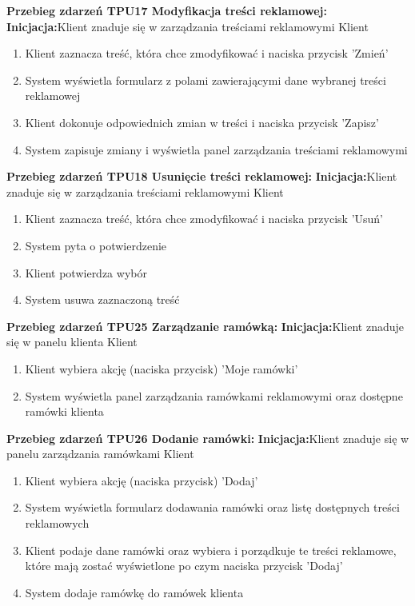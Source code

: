 \documentclass[10pt,a4paper,titlepage]{article} %
\begin{document}
		{\bf Przebieg zdarzeń TPU17 Modyfikacja treści reklamowej:}\newline
		{\bf Inicjacja:}Klient znaduje się w zarządzania treściami reklamowymi
		 Klient
			\begin{enumerate}
			  \item Klient zaznacza treść, która chce zmodyfikować i naciska przycisk
			  'Zmień'
			  \item System wyświetla formularz z polami zawierającymi dane wybranej
			  treści reklamowej
			  \item Klient dokonuje odpowiednich zmian w treści i naciska przycisk
			  'Zapisz'
			  \item System zapisuje zmiany i wyświetla panel zarządzania treściami
			  reklamowymi
			\end{enumerate}
			
		{\bf Przebieg zdarzeń TPU18 Usunięcie treści reklamowej:}\newline
		{\bf Inicjacja:}Klient znaduje się w zarządzania treściami reklamowymi
		 Klient
			\begin{enumerate}
			  \item Klient zaznacza treść, która chce zmodyfikować i naciska przycisk
			  'Usuń'
			  \item System pyta o potwierdzenie
			  \item Klient potwierdza wybór
			  \item System usuwa zaznaczoną treść
			\end{enumerate}
			
		{\bf Przebieg zdarzeń TPU25 Zarządzanie ramówką:}\newline
		{\bf Inicjacja:}Klient znaduje się w panelu klienta
		 Klient
			\begin{enumerate}
			  \item Klient wybiera akcję (naciska przycisk) 'Moje ramówki'
			  \item System wyświetla panel zarządzania ramówkami reklamowymi oraz
			  dostępne ramówki klienta
			\end{enumerate}
			
		{\bf Przebieg zdarzeń TPU26 Dodanie ramówki:}\newline
		{\bf Inicjacja:}Klient znaduje się w panelu zarządzania ramówkami
		 Klient
			\begin{enumerate}
			  \item Klient wybiera akcję (naciska przycisk) 'Dodaj'
			  \item System wyświetla formularz dodawania ramówki oraz listę dostępnych
			  treści reklamowych
			  \item Klient podaje dane ramówki oraz wybiera i porządkuje te treści
			  reklamowe, które mają zostać wyświetlone po czym naciska przycisk 'Dodaj'
			  \item System dodaje ramówkę do ramówek klienta
			\end{enumerate}
			
\end{document}
